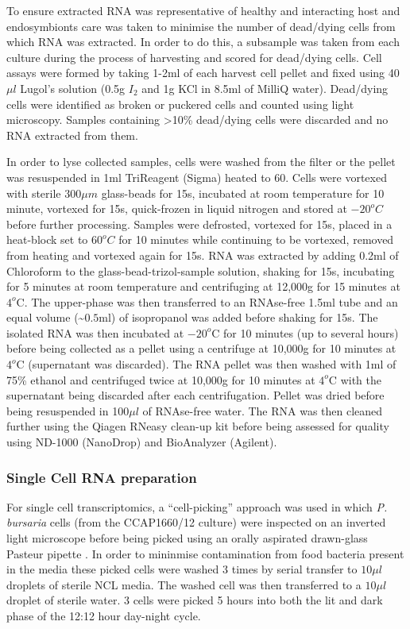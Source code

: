 To ensure extracted RNA was representative of healthy and interacting host 
and endosymbionts care was taken to minimise the number of dead/dying cells 
from which RNA was extracted.  In order to do this, a subsample was taken 
from each culture during the process of harvesting and scored for dead/dying cells.  
Cell assays were formed by taking 1-2ml of each harvest cell pellet and 
fixed using 40\(\mu l\) Lugol's solution (0.5g \(I_{2}\) and 1g KCl in 8.5ml 
of MilliQ water). Dead/dying cells were identified as broken or puckered cells 
and counted using light microscopy.  Samples containing >10\% dead/dying cells 
were discarded and no RNA extracted from them.

In order to lyse collected samples, cells were washed from the filter or the 
pellet was resuspended in 1ml TriReagent (Sigma) heated to \(60\)\celsius. 
Cells were vortexed with sterile \(300\mu m\) glass-beads for 15s, incubated at 
room temperature for 10 minute, vortexed for 15s, quick-frozen in liquid 
nitrogen and stored at \(-20^{o}C\) before further processing.  
Samples were defrosted, vortexed for 15s, placed in a heat-block set 
to \(60^{o}C\) for 10 minutes while continuing to be vortexed, removed from 
heating and vortexed again for 15s.  
RNA was extracted by adding 0.2ml of Chloroform to the glass-bead-trizol-sample 
solution, shaking for 15s, incubating for 5 minutes at room temperature and 
centrifuging at 12,000g for 15 minutes at $4^{o}$C.  
The upper-phase was then transferred to an RNAse-free 1.5ml tube and an 
equal volume (\textasciitilde$0.5$ml) of isopropanol was added before shaking for 15s.  
The isolated RNA was then incubated at $-20^{o}$C for 10 minutes 
(up to several hours) before being collected as a pellet using a centrifuge at 
10,000g for 10 minutes at $4^{o}$C (supernatant was discarded). 
The RNA pellet was then washed with 1ml of 75\% ethanol and centrifuged 
twice at 10,000g for 10 minutes at $4^{o}$C with the supernatant being 
discarded after each centrifugation.  
Pellet was dried before being resuspended in 100$\mu l$ of RNAse-free water.  
The RNA was then cleaned further using the Qiagen RNeasy clean-up kit 
before being assessed for quality using ND-1000 (NanoDrop) and BioAnalyzer (Agilent).


\subsubsection{Single Cell RNA preparation}

For single cell transcriptomics, a ``cell-picking'' approach was used in which
\textit{P. bursaria} cells (from the CCAP1660/12 culture) were inspected on an inverted light microscope 
before being picked using an orally aspirated drawn-glass Pasteur pipette \citep{Garcia-Cuetos2012}.
In order to mininmise contamination from food bacteria present in the media these picked cells
were washed 3 times by serial transfer to \(10\mu l\) droplets of sterile NCL media.
The washed cell was then transferred to a \(10\mu l\) droplet of sterile water.
3 cells were picked 5 hours into both the lit and dark phase of the 12:12 hour day-night cycle.

